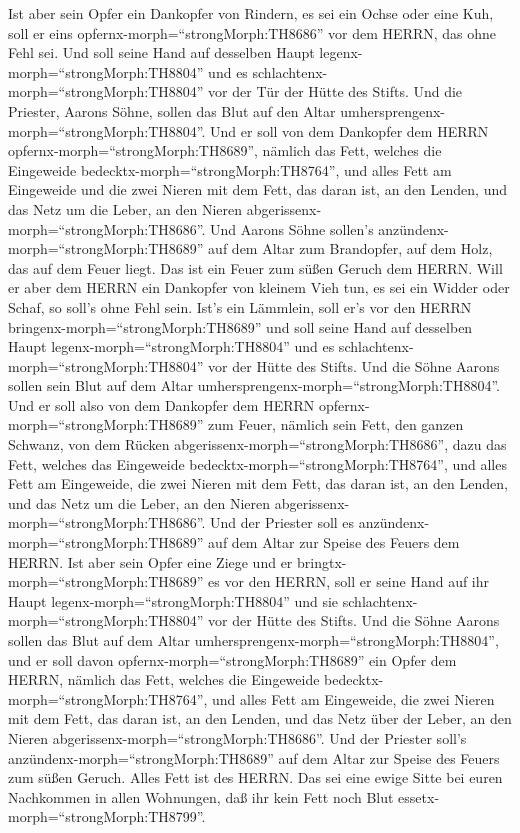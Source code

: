  Ist aber sein Opfer ein Dankopfer von Rindern, es sei ein
Ochse oder eine Kuh, soll er eins opfernx-morph=``strongMorph:TH8686''
vor dem HERRN, das ohne Fehl sei.  Und soll seine Hand auf
desselben Haupt legenx-morph=``strongMorph:TH8804'' und es
schlachtenx-morph=``strongMorph:TH8804'' vor der Tür der Hütte des
Stifts. Und die Priester, Aarons Söhne, sollen das Blut auf den Altar
umhersprengenx-morph=``strongMorph:TH8804''.  Und er soll
von dem Dankopfer dem HERRN opfernx-morph=``strongMorph:TH8689'',
nämlich das Fett, welches die Eingeweide
bedecktx-morph=``strongMorph:TH8764'', und alles Fett am Eingeweide
 und die zwei Nieren mit dem Fett, das daran ist, an den
Lenden, und das Netz um die Leber, an den Nieren
abgerissenx-morph=``strongMorph:TH8686''.  Und Aarons Söhne
sollen's anzündenx-morph=``strongMorph:TH8689'' auf dem Altar zum
Brandopfer, auf dem Holz, das auf dem Feuer liegt. Das ist ein Feuer zum
süßen Geruch dem HERRN.  Will er aber dem HERRN ein
Dankopfer von kleinem Vieh tun, es sei ein Widder oder Schaf, so soll's
ohne Fehl sein.  Ist's ein Lämmlein, soll er's vor den HERRN
bringenx-morph=``strongMorph:TH8689''  und soll seine Hand
auf desselben Haupt legenx-morph=``strongMorph:TH8804'' und es
schlachtenx-morph=``strongMorph:TH8804'' vor der Hütte des Stifts. Und
die Söhne Aarons sollen sein Blut auf dem Altar
umhersprengenx-morph=``strongMorph:TH8804''.  Und er soll
also von dem Dankopfer dem HERRN opfernx-morph=``strongMorph:TH8689''
zum Feuer, nämlich sein Fett, den ganzen Schwanz, von dem Rücken
abgerissenx-morph=``strongMorph:TH8686'', dazu das Fett, welches das
Eingeweide bedecktx-morph=``strongMorph:TH8764'', und alles Fett am
Eingeweide,  die zwei Nieren mit dem Fett, das daran ist,
an den Lenden, und das Netz um die Leber, an den Nieren
abgerissenx-morph=``strongMorph:TH8686''.  Und der Priester
soll es anzündenx-morph=``strongMorph:TH8689'' auf dem Altar zur Speise
des Feuers dem HERRN.  Ist aber sein Opfer eine Ziege und
er bringtx-morph=``strongMorph:TH8689'' es vor den HERRN, 
soll er seine Hand auf ihr Haupt legenx-morph=``strongMorph:TH8804'' und
sie schlachtenx-morph=``strongMorph:TH8804'' vor der Hütte des Stifts.
Und die Söhne Aarons sollen das Blut auf dem Altar
umhersprengenx-morph=``strongMorph:TH8804'',  und er soll
davon opfernx-morph=``strongMorph:TH8689'' ein Opfer dem HERRN, nämlich
das Fett, welches die Eingeweide bedecktx-morph=``strongMorph:TH8764'',
und alles Fett am Eingeweide,  die zwei Nieren mit dem
Fett, das daran ist, an den Lenden, und das Netz über der Leber, an den
Nieren abgerissenx-morph=``strongMorph:TH8686''.  Und der
Priester soll's anzündenx-morph=``strongMorph:TH8689'' auf dem Altar zur
Speise des Feuers zum süßen Geruch. Alles Fett ist des HERRN.
 Das sei eine ewige Sitte bei euren Nachkommen in allen
Wohnungen, daß ihr kein Fett noch Blut
essetx-morph=``strongMorph:TH8799''.

